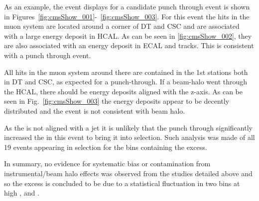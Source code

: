 

As an example, the event displays for a candidate punch through event is shown in 
Figures~\ref{fig:cmsShow_001}-~\ref{fig:cmsShow_003}.
For this event the hits in the muon system are located around a corner of DT and
CSC and are associated with a large energy deposit in HCAL. As can be seen
in \ref{fig:cmsShow_002}, they are also associated with an energy deposit in ECAL and tracks.
This is consistent with a punch through event.

All hits in the muon system around there are contained in the 1st
stations both in DT and CSC, as expected for a punch-through. 
If a beam-halo went through the HCAL, there should be energy deposits
aligned with the z-axis. As can be seen in Fig.~\ref{fig:cmsShow_003} the energy deposits
appear to be decently distributed and the event is not consistent with beam halo.

As the \met is not aligned with a jet it is unlikely that the punch through
significantly increased the \met in this event to bring it into selection. 
Such analysis was made of all 19 events appearing in selection for the bins
containing the excess.

In summary, no evidence for systematic bias or contamination from 
instrumental/beam halo effects was observed from the studies detailed above
and so the excess is concluded to be due to a statistical fluctuation 
in two bins at high \njet, \nb and \scalht. 



